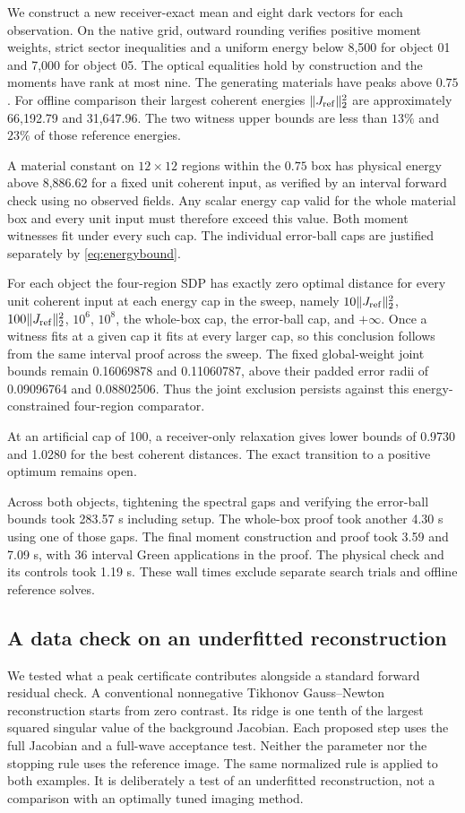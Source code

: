 \documentclass[anonymous,12pt]{iopjournal}
\theoremstyle{remark}\newtheorem{remark}[theorem]{Remark}
\numberwithin{equation}{section}
\begin{document}
We construct a new receiver-exact mean and eight dark vectors for each observation. On the native grid, outward rounding verifies positive moment weights, strict sector inequalities and a uniform energy below 8,500 for object 01 and 7,000 for object 05. The optical equalities hold by construction and the moments have rank at most nine. The generating materials have peaks above $0.75$. For offline comparison their largest coherent energies $\|J_{\rm ref}\|_2^2$ are approximately 66,192.79 and 31,647.96. The two witness upper bounds are less than $13\%$ and $23\%$ of those reference energies.

A material constant on $12\times12$ regions within the $0.75$ box has physical energy above 8,886.62 for a fixed unit coherent input, as verified by an interval forward check using no observed fields. Any scalar energy cap valid for the whole material box and every unit input must therefore exceed this value. Both moment witnesses fit under every such cap. The individual error-ball caps are justified separately by \eqref{eq:energybound}.

For each object the four-region SDP has exactly zero optimal distance for every unit coherent input at each energy cap in the sweep, namely $10\|J_{\rm ref}\|_2^2$, $100\|J_{\rm ref}\|_2^2$, $10^6$, $10^8$, the whole-box cap, the error-ball cap, and $+\infty$. Once a witness fits at a given cap it fits at every larger cap, so this conclusion follows from the same interval proof across the sweep. The fixed global-weight joint bounds remain 0.16069878 and 0.11060787, above their padded error radii of 0.09096764 and 0.08802506. Thus the joint exclusion persists against this energy-constrained four-region comparator.

At an artificial cap of 100, a receiver-only relaxation gives lower bounds of 0.9730 and 1.0280 for the best coherent distances. The exact transition to a positive optimum remains open.

Across both objects, tightening the spectral gaps and verifying the error-ball bounds took 283.57 s including setup. The whole-box proof took another 4.30 s using one of those gaps. The final moment construction and proof took 3.59 and 7.09 s, with 36 interval Green applications in the proof. The physical check and its controls took 1.19 s. These wall times exclude separate search trials and offline reference solves.

\subsection{A data check on an underfitted reconstruction}
We tested what a peak certificate contributes alongside a standard forward residual check. A conventional nonnegative Tikhonov Gauss--Newton reconstruction starts from zero contrast. Its ridge is one tenth of the largest squared singular value of the background Jacobian. Each proposed step uses the full Jacobian and a full-wave acceptance test. Neither the parameter nor the stopping rule uses the reference image. The same normalized rule is applied to both examples. It is deliberately a test of an underfitted reconstruction, not a comparison with an optimally tuned imaging method.
\end{document}
